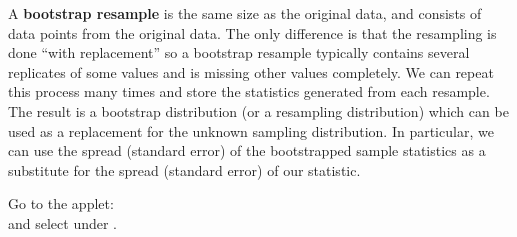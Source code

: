   A {\bf bootstrap resample} is the same size as the original data, and
  consists of data points from the original data.  The only difference
  is that the resampling is done ``with replacement'' so a bootstrap
  resample typically contains several replicates of some values and is
  missing other values completely.  We can repeat this process many
  times and store the statistics generated from each resample.  The
  result is a bootstrap distribution (or a resampling distribution)
  which can be used as a replacement for the unknown sampling
  distribution.  In particular, we can use the spread (standard error)
  of the bootstrapped sample statistics as a substitute for the spread
  (standard error) of our statistic.  

   

Go to  the applet:\\
\webAppURLFrst and 
select under  .
\vspace{-.2in}

